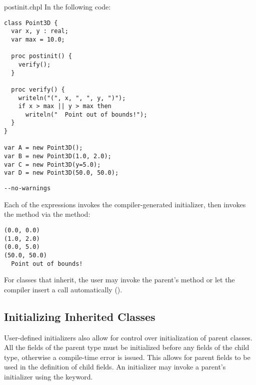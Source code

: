 \begin{chapelexample}{postinit.chpl}
In the following code:
\begin{chapel}
\begin{verbatim}
class Point3D {
  var x, y : real;
  var max = 10.0;

  proc postinit() {
    verify();
  }

  proc verify() {
    writeln("(", x, ", ", y, ")");
    if x > max || y > max then
      writeln("  Point out of bounds!");
  }
}

var A = new Point3D();
var B = new Point3D(1.0, 2.0);
var C = new Point3D(y=5.0);
var D = new Point3D(50.0, 50.0);
\end{verbatim}
\end{chapel}
\begin{chapelcompopts}
\begin{verbatim}
--no-warnings
\end{verbatim}
\end{chapelcompopts}
Each of the  expressions invokes the compiler-generated initializer,
then invokes the  method via the  method:
\begin{chapelprintoutput}
\begin{verbatim}
(0.0, 0.0)
(1.0, 2.0)
(0.0, 5.0)
(50.0, 50.0)
  Point out of bounds!
\end{verbatim}
\end{chapelprintoutput}
\end{chapelexample}

For classes that inherit, the user may invoke the parent's 
method or let the compiler insert a call automatically
().

\subsection{Initializing Inherited Classes}
\label{Initializing_Inherited}

User-defined initializers also allow for control over initialization of parent
classes. All the fields of the parent type must be initialized before any
fields of the child type, otherwise a compile-time error is issued. This allows
for parent fields to be used in the definition of child fields. An initializer
may invoke a parent's initializer using the  keyword.

